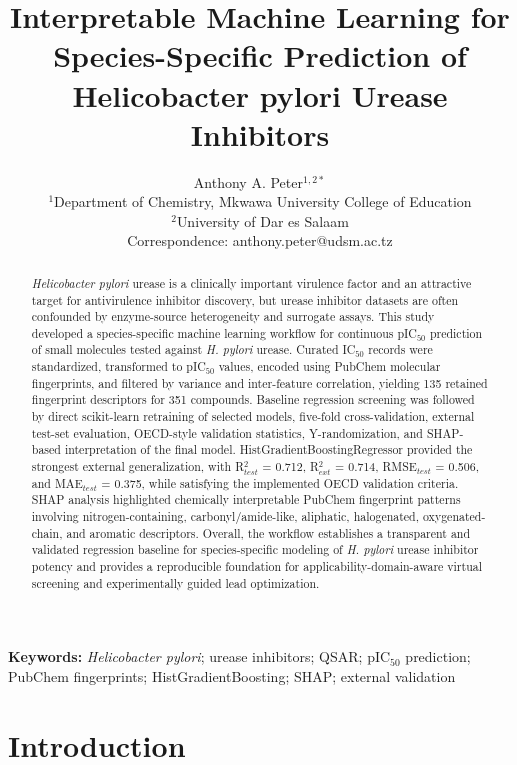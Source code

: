 \documentclass[11pt]{article}
\title{Interpretable Machine Learning for Species-Specific Prediction of Helicobacter pylori Urease Inhibitors}
\author{Anthony A. Peter$^{1,2*}$\\
\small $^{1}$Department of Chemistry, Mkwawa University College of Education\\
\small $^{2}$University of Dar es Salaam\\
\small *Correspondence: anthony.peter@udsm.ac.tz}
\date{}
\begin{document}
\maketitle


\begin{abstract}
\textit{Helicobacter pylori} urease is a clinically important virulence factor and an attractive target for antivirulence inhibitor discovery, but urease inhibitor datasets are often confounded by enzyme-source heterogeneity and surrogate assays. This study developed a species-specific machine learning workflow for continuous pIC$_{50}$ prediction of small molecules tested against \textit{H. pylori} urease. Curated IC$_{50}$ records were standardized, transformed to pIC$_{50}$ values, encoded using PubChem molecular fingerprints, and filtered by variance and inter-feature correlation, yielding 135 retained fingerprint descriptors for 351 compounds. Baseline regression screening was followed by direct scikit-learn retraining of selected models, five-fold cross-validation, external test-set evaluation, OECD-style validation statistics, Y-randomization, and SHAP-based interpretation of the final model. HistGradientBoostingRegressor provided the strongest external generalization, with R$^2_{test}$ = 0.712, R$^2_{ext}$ = 0.714, RMSE$_{test}$ = 0.506, and MAE$_{test}$ = 0.375, while satisfying the implemented OECD validation criteria. SHAP analysis highlighted chemically interpretable PubChem fingerprint patterns involving nitrogen-containing, carbonyl/amide-like, aliphatic, halogenated, oxygenated-chain, and aromatic descriptors. Overall, the workflow establishes a transparent and validated regression baseline for species-specific modeling of \textit{H. pylori} urease inhibitor potency and provides a reproducible foundation for applicability-domain-aware virtual screening and experimentally guided lead optimization.
\end{abstract}

\noindent\textbf{Keywords:} \textit{Helicobacter pylori}; urease inhibitors; QSAR; pIC$_{50}$ prediction; PubChem fingerprints; HistGradientBoosting; SHAP; external validation


\section{Introduction}
\end{document}
